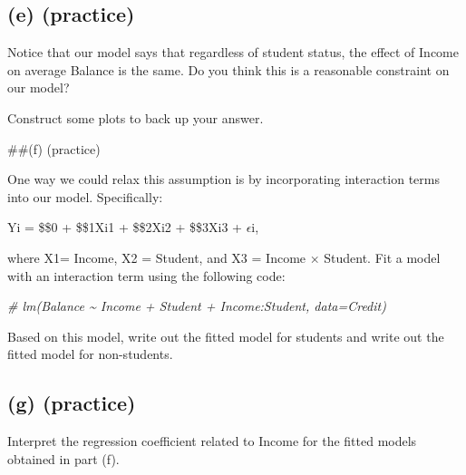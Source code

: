 \documentclass[
]{article}
\newenvironment{Shaded}{\begin{snugshade}}{\end{snugshade}}
\newcommand{\CommentTok}[1]{\textcolor[rgb]{0.56,0.35,0.01}{\textit{#1}}}
\begin{document}
\subsection{(e) (practice)}\label{e-practice}

Notice that our model says that regardless of student status, the effect
of Income on average Balance is the same. Do you think this is a
reasonable constraint on our model?

Construct some plots to back up your answer.

\#\#(f) (practice)

One way we could relax this assumption is by incorporating interaction
terms into our model. Specifically:

Yi = \$\beta\$0 + \$\beta\$1Xi1 + \$\beta\$2Xi2 + \$\beta\$3Xi3 +
\(\epsilon\)i,

where X1= Income, X2 = Student, and X3 = Income × Student. Fit a model
with an interaction term using the following code:

\begin{Shaded}
\begin{Highlighting}[]
\CommentTok{\# lm(Balance \textasciitilde{} Income + Student + Income:Student, data=Credit)}
\end{Highlighting}
\end{Shaded}

Based on this model, write out the fitted model for students and write
out the fitted model for non-students.

\subsection{(g) (practice)}\label{g-practice}

Interpret the regression coefficient related to Income for the fitted
models obtained in part (f).
\end{document}
